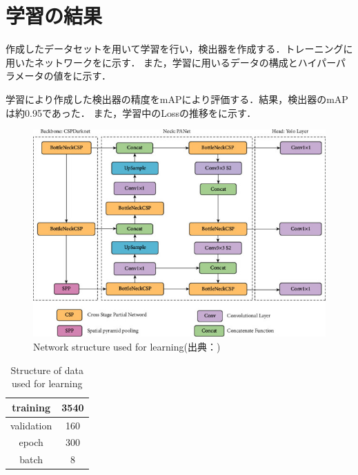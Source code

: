 \documentclass[../main]{subfiles}
\begin{document}
        \clearpage

        \section{学習の結果}
        作成したデータセットを用いて学習を行い，検出器を作成する．トレーニングに用いたネットワークをに示す．
        また，学習に用いるデータの構成とハイパーパラメータの値をに示す．
        

        学習により作成した検出器の精度をmAPにより評価する．結果，検出器のmAPは約0.95であった．
        また，学習中のLossの推移をに示す．

        \begin{figure}[H]
         \centering
         \includegraphics[scale=0.65]{../images/yolov5_architecture.jpg}
         \caption{Network structure used for learning(出典：\cite{yolov5_figure})}
         \label{figure::yolov5_architecture}
        \end{figure}

        \begin{table}[H]
            \caption{Structure of data used for learning}
            \centering
            \label{table::learning}
            \begin{tabular}{l|l}
            \hline
            \multicolumn{1}{c|}{training}   & \multicolumn{1}{c}{3540}                \\ \hline
            \multicolumn{1}{c|}{validation} & \multicolumn{1}{c}{160}                  \\ \hline
            \multicolumn{1}{c|}{epoch}      & \multicolumn{1}{c}{300}                \\ \hline
            \multicolumn{1}{c|}{batch}      & \multicolumn{1}{c}{8}                   \\ \hline
            \end{tabular}
        \end{table}
\end{document}
